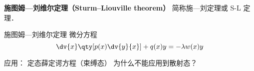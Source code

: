 
\begin{issues}
\issueDraft
\end{issues}

\textbf{施图姆—刘维尔定理（Sturm–Liouville theorem）} 简称施—刘定理或 S-L 定理．

\begin{theorem}{施图姆—刘维尔定理}
微分方程
\begin{equation}
\dv{x}\qty[p(x)\dv{y}{x}] + q(x) y = -\lambda w(x) y
\end{equation}
\end{theorem}

应用： 定态薛定谔方程（束缚态） 为什么不能应用到散射态？
